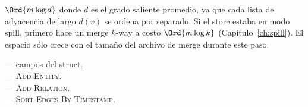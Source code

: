 \begin{algorithm}
\caption{\textsc{Sort-Edges-By-Timestamp}}\label{alg:finalize-sort}
\end{algorithm}

\begin{complexity}
$\Ord{m \log \bar d}$ donde $\bar d$ es el grado saliente
promedio, ya que cada lista de adyacencia de largo $d(v)$ se
ordena por separado. Si el store estaba en modo spill,
 primero hace un merge $k$-way a costo $\Ord{m \log
k}$ (Capítulo~\ref{ch:spill}). El espacio sólo crece con el
tamaño del archivo de merge durante este paso.
\end{complexity}

\begin{inthecode}
 --- campos del
struct.\\
 ---
\textsc{Add-Entity}.\\
 ---
\textsc{Add-Relation}.\\
 ---
\textsc{Sort-Edges-By-Timestamp}.
\end{inthecode}
